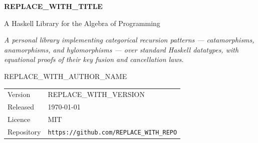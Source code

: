 \begin{titlepage}
\thispagestyle{empty}


\vspace*{62mm}

{\Huge\bfseries REPLACE\_WITH\_TITLE\par}
\vspace{3mm}
{\Large\color{cpaccent} A Haskell Library for the Algebra of Programming\par}

\vspace{8mm}

{\normalsize\itshape
A personal library implementing categorical recursion patterns —
catamorphisms, anamorphisms, and hylomorphisms — over standard Haskell
datatypes, with equational proofs of their key fusion and cancellation laws.
\par}

\vspace{18mm}

{\large REPLACE\_WITH\_AUTHOR\_NAME\par}

\vfill

{\small
\begin{tabular}{ll}
Version   & REPLACE\_WITH\_VERSION \\
Released  & \today \\
Licence   & MIT \\
Repository & \texttt{https://github.com/REPLACE\_WITH\_REPO} \\
\end{tabular}
\par}

\vspace{16mm}

\end{titlepage}
